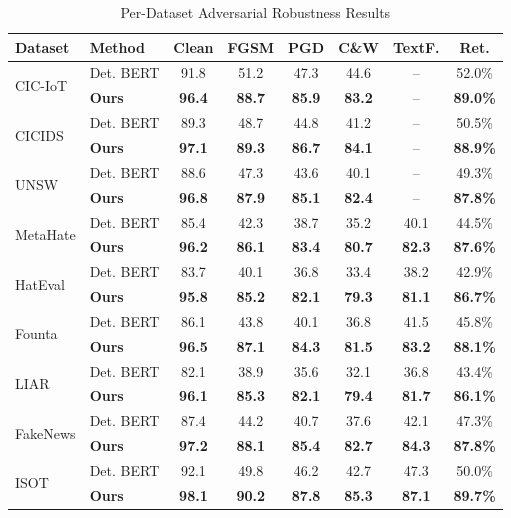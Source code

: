 \documentclass[12pt,a4paper]{article}
\theoremstyle{definition}
\begin{document}
\begin{table}[H]
\caption{Per-Dataset Adversarial Robustness Results}
\label{tab:robustness_detailed}
\centering
\footnotesize
\setlength{\tabcolsep}{2.5pt}
\begin{tabular}{@{}llcccccc@{}}
\toprule
\textbf{Dataset} & \textbf{Method} & \textbf{Clean} & \textbf{FGSM} & \textbf{PGD} & \textbf{C\&W} & \textbf{TextF.} & \textbf{Ret.} \\
\midrule
\multirow{2}{*}{CIC-IoT} 
& Det. BERT & 91.8 & 51.2 & 47.3 & 44.6 & -- & 52.0\% \\
& \textbf{Ours} & \textbf{96.4} & \textbf{88.7} & \textbf{85.9} & \textbf{83.2} & -- & \textbf{89.0\%} \\
\midrule
\multirow{2}{*}{CICIDS} 
& Det. BERT & 89.3 & 48.7 & 44.8 & 41.2 & -- & 50.5\% \\
& \textbf{Ours} & \textbf{97.1} & \textbf{89.3} & \textbf{86.7} & \textbf{84.1} & -- & \textbf{88.9\%} \\
\midrule
\multirow{2}{*}{UNSW} 
& Det. BERT & 88.6 & 47.3 & 43.6 & 40.1 & -- & 49.3\% \\
& \textbf{Ours} & \textbf{96.8} & \textbf{87.9} & \textbf{85.1} & \textbf{82.4} & -- & \textbf{87.8\%} \\
\midrule
\multirow{2}{*}{MetaHate} 
& Det. BERT & 85.4 & 42.3 & 38.7 & 35.2 & 40.1 & 44.5\% \\
& \textbf{Ours} & \textbf{96.2} & \textbf{86.1} & \textbf{83.4} & \textbf{80.7} & \textbf{82.3} & \textbf{87.6\%} \\
\midrule
\multirow{2}{*}{HatEval} 
& Det. BERT & 83.7 & 40.1 & 36.8 & 33.4 & 38.2 & 42.9\% \\
& \textbf{Ours} & \textbf{95.8} & \textbf{85.2} & \textbf{82.1} & \textbf{79.3} & \textbf{81.1} & \textbf{86.7\%} \\
\midrule
\multirow{2}{*}{Founta} 
& Det. BERT & 86.1 & 43.8 & 40.1 & 36.8 & 41.5 & 45.8\% \\
& \textbf{Ours} & \textbf{96.5} & \textbf{87.1} & \textbf{84.3} & \textbf{81.5} & \textbf{83.2} & \textbf{88.1\%} \\
\midrule
\multirow{2}{*}{LIAR} 
& Det. BERT & 82.1 & 38.9 & 35.6 & 32.1 & 36.8 & 43.4\% \\
& \textbf{Ours} & \textbf{96.1} & \textbf{85.3} & \textbf{82.1} & \textbf{79.4} & \textbf{81.7} & \textbf{86.1\%} \\
\midrule
\multirow{2}{*}{FakeNews} 
& Det. BERT & 87.4 & 44.2 & 40.7 & 37.6 & 42.1 & 47.3\% \\
& \textbf{Ours} & \textbf{97.2} & \textbf{88.1} & \textbf{85.4} & \textbf{82.7} & \textbf{84.3} & \textbf{87.8\%} \\
\midrule
\multirow{2}{*}{ISOT} 
& Det. BERT & 92.1 & 49.8 & 46.2 & 42.7 & 47.3 & 50.0\% \\
& \textbf{Ours} & \textbf{98.1} & \textbf{90.2} & \textbf{87.8} & \textbf{85.3} & \textbf{87.1} & \textbf{89.7\%} \\
\bottomrule
\end{tabular}
\end{table}
\end{document}
